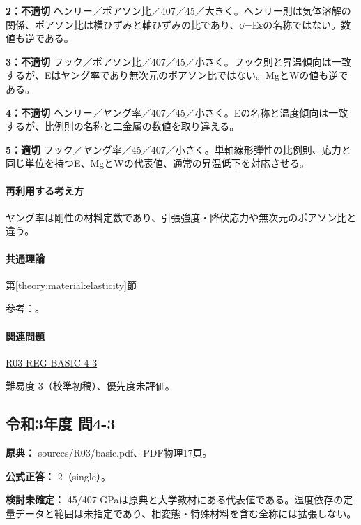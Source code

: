 \noindent\textbf{2：不適切} ヘンリー／ポアソン比／407／45／大きく。ヘンリー則は気体溶解の関係、ポアソン比は横ひずみと軸ひずみの比であり、σ=Eεの名称ではない。数値も逆である。\par

\noindent\textbf{3：不適切} フック／ポアソン比／407／45／小さく。フック則と昇温傾向は一致するが、Eはヤング率であり無次元のポアソン比ではない。MgとWの値も逆である。\par

\noindent\textbf{4：不適切} ヘンリー／ヤング率／407／45／小さく。Eの名称と温度傾向は一致するが、比例則の名称と二金属の数値を取り違える。\par

\noindent\textbf{5：適切} フック／ヤング率／45／407／小さく。単軸線形弾性の比例則、応力と同じ単位を持つE、MgとWの代表値、通常の昇温低下を対応させる。\par

\paragraph{再利用する考え方} ヤング率は剛性の材料定数であり、引張強度・降伏応力や無次元のポアソン比と違う。

\paragraph{共通理論} \hyperref[theory:material:elasticity]{第\ref*{theory:material:elasticity}節}

\par 参考：\cite{mit_material_elastic2000,princeton_magnesium,princeton_tungsten}。

\paragraph{関連問題} \hyperref[q:r03-reg-basic-4-3]{R03-REG-BASIC-4-3}

\par 難易度 3（校準初稿）、優先度未評価。

\subsection{令和3年度 問4-3}
\label{q:r03-reg-basic-4-3}

\noindent\textbf{原典：} sources/R03/basic.pdf、PDF物理17頁。

\textbf{公式正答：} 2（single）。

\par\textbf{検討未確定：} 45/407 GPaは原典と大学教材にある代表値である。温度依存の定量データと範囲は未指定であり、相変態・特殊材料を含む全称には拡張しない。

